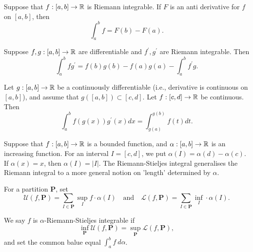 \documentclass[twoside]{article}
\begin{document}
\begin{theorem}
    Suppose that $f : [a,b] \to \mathbb{R}$ is Riemann integrable. If $F$ is an 
    anti derivative for $f$ on $[a,b]$, then 
    \begin{equation*}
        \int_{a}^{b} f = F(b) - F(a).
    \end{equation*}
\end{theorem}

\begin{theorem}
    Suppose $f, g : [a,b] \to \mathbb{R}$ are differentiable and $f^{\prime}, g^{\prime}$ are 
    Riemann integrable. Then 
    \begin{equation*}
        \int_{a}^{b} fg^{\prime} = f(b)g(b) - f(a)g(a) - \int_{a}^{b} f^{\prime}g.
    \end{equation*}
\end{theorem}

\begin{theorem}
	Let $g : [a, b] \to \mathbb{R}$ be a continuously differentiable (i.e., derivative is continuous on $[a,b]$),
	and assume that $g([a,b]) \subset [c, d]$. Let $f : [c,d] \to \mathbb{R}$ be continuous. Then
	\begin{equation*}
		\int_{a}^{b} f(g(x))g^{\prime}(x) dx = \int_{g(a)}^{g(b)} f(t) dt.
	\end{equation*}
\end{theorem}

\begin{theorem}
	Suppose that $f : [a,b] \to \mathbb{R}$ is a bounded function, and $\alpha : [a,b] \to \mathbb{R}$ is an increasing function.
	For an interval $I = [c,d]$, we put $\alpha(I) = \alpha(d) - \alpha(c)$. If $\alpha(x) = x$, then
	$\alpha(I) = | I |$. The Riemann-Stieljes integral generalises the Riemann integral to a
	more general notion on 'length' determined by $\alpha$.

	For a partition $\bm{P}$, set
	\begin{equation*}
		\mathcal{U}(f, \bm{P}) = \sum_{I \in \bm{P}} \sup_{I} f \cdot \alpha(I) \quad \text{and} \quad
		\mathcal{L}(f, \bm{P}) = \sum_{I \in \bm{P}} \inf_{I} \cdot \alpha(I).
	\end{equation*}

	We say $f$ is $\alpha$-Riemann-Stieljes integrable if
	\begin{equation*}
		\inf_{\bm{P}}\mathcal{U}(f, \bm{P}) = \sup_{\bm{P}} \mathcal{L}(f, \bm{P}),
	\end{equation*}
	and set the common balue equal $\int_{a}^{b} f \ d \alpha$.
\end{theorem}
\end{document}

